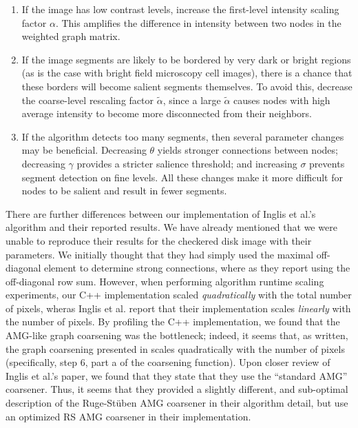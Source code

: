 \documentclass[12pt]{article}%
\begin{document}
\begin{enumerate}

\item If the image has low contrast levels, increase the first-level intensity scaling factor $\alpha$. This amplifies the difference in intensity between two nodes in the weighted graph matrix.

\item If the image segments are likely to be bordered by very dark or bright regions (as is the case with bright field microscopy cell images), there is a chance that these borders will become salient segments themselves. To avoid this, decrease the coarse-level rescaling factor $\tilde{\alpha}$, since a large $\tilde{\alpha}$ causes nodes with high average intensity to become more disconnected from their neighbors.

\item If the algorithm detects too many segments, then several parameter changes may be beneficial. Decreasing $\theta$ yields stronger connections between nodes; decreasing $\gamma$ provides a stricter salience threshold; and increasing $\sigma$ prevents segment detection on fine levels. All these changes make it more difficult for nodes to be salient and result in fewer segments.

\end{enumerate}

There are further differences between our implementation of Inglis et al.'s algorithm and their reported results.  We have already mentioned that we were unable to reproduce their results for the checkered disk image with their parameters.  We initially thought that they had simply used the maximal off-diagonal element to determine strong connections, where as they report using the off-diagonal row sum.  However, when performing algorithm runtime scaling experiments, our C++ implementation scaled \emph{quadratically} with the total number of pixels, wheras Inglis et al. report that their implementation scales \emph{linearly} with the number of pixels.  By profiling the C++ implementation, we found that the AMG-like graph coarsening was the bottleneck; indeed, it seems that, as written, the graph coarsening presented in \cite{inglis:2010} scales quadratically with the number of pixels (specifically, step 6, part a of the coarsening function).  Upon closer review of Inglis et al.'s paper, we found that they state that they use the ``standard AMG'' coarsener.  Thus, it seems that they provided a slightly different, and sub-optimal description of the Ruge-St\"uben AMG coarsener in their algorithm detail, but use an optimized RS AMG coarsener in their implementation.\\
\end{document}
